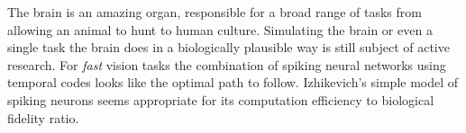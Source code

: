 The brain is an amazing organ, responsible for a broad range of tasks from allowing an animal to hunt to human culture. Simulating the brain or even a single task the brain does in a biologically plausible way is still subject of active research. For \emph{fast} vision tasks the combination of spiking neural networks using temporal codes looks like the optimal path to follow. Izhikevich's simple model of spiking neurons seems appropriate for its computation efficiency to biological fidelity ratio.